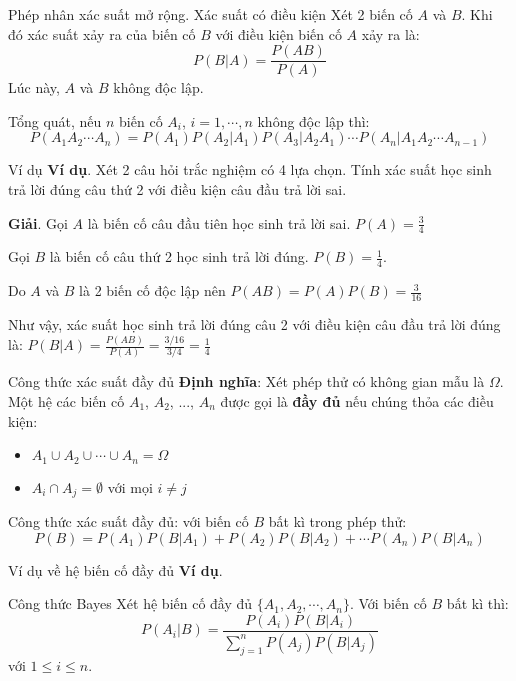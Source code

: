 \documentclass[aspectratio=169,xcolor=dvipsnames,serif]{beamer}
\begin{document}
\begin{frame}{Phép nhân xác suất mở rộng. Xác suất có điều kiện}
    Xét 2 biến cố $A$ và $B$. Khi đó xác suất xảy ra của biến cố $B$ với điều kiện biến cố $A$ xảy ra là: \[P(B | A) = \frac{P(AB)}{P(A)}\]
    Lúc này, $A$ và $B$ không độc lập.
    
    Tổng quát, nếu $n$ biến cố $A_i$, $i=1, \cdots, n$ không độc lập thì: \[P(A_1 A_2 \cdots A_n) = P(A_1)P(A_2|A_1)P(A_3 | A_2A_1)\cdots P(A_n|A_1A_2 \cdots A_{n-1})\]
\end{frame}

\begin{frame}{Ví dụ}
    \textbf{Ví dụ}. Xét 2 câu hỏi trắc nghiệm có 4 lựa chọn. Tính xác suất học sinh trả lời đúng câu thứ 2 với điều kiện câu đầu trả lời sai.
    
    \textbf{Giải}. Gọi $A$ là biến cố câu đầu tiên học sinh trả lời sai. $P(A) = \frac{3}{4}$
    
    Gọi $B$ là biến cố câu thứ 2 học sinh trả lời đúng. $P(B) = \frac{1}{4}$.
    
    Do $A$ và $B$ là 2 biến cố độc lập nên $P(AB) = P(A) P(B) = \frac{3}{16}$
    
    Như vậy, xác suất học sinh trả lời đúng câu 2 với điều kiện câu đầu trả lời đúng là: $P(B | A) = \frac{P(AB)}{P(A)} = \frac{3 / 16}{3 / 4} = \frac{1}{4}$
\end{frame}

\begin{frame}{Công thức xác suất đầy đủ}
    \textbf{Định nghĩa}: Xét phép thử có không gian mẫu là $\Omega$. Một hệ các biến cố $A_1$, $A_2$, ..., $A_n$ được gọi là \textbf{đầy đủ} nếu chúng thỏa các điều kiện:
    \begin{itemize}
        \item $A_1 \cup A_2 \cup \cdots \cup A_n = \Omega$
        \item $A_i \cap A_j = \emptyset$ với mọi $i \neq j$
    \end{itemize}
    
    Công thức xác suất đầy đủ: với biến cố $B$ bất kì trong phép thử: \[P(B) = P(A_1) P(B | A_1) + P(A_2) P(B | A_2) + \cdots P(A_n) P(B | A_n)\]
\end{frame}

\begin{frame}{Ví dụ về hệ biến cố đầy đủ}
    \textbf{Ví dụ}.
\end{frame}

\begin{frame}{Công thức Bayes}
    Xét hệ biến cố đầy đủ $\{A_1, A_2, \cdots, A_n\}$. Với biến cố $B$ bất kì thì: \[P(A_i | B) = \frac{P(A_i) P(B | A_i)}{\displaystyle{\sum_{j=1}^n P(A_j) P(B | A_j)}}\] với $1 \leq i \leq n$.
\end{frame}
\end{document}
